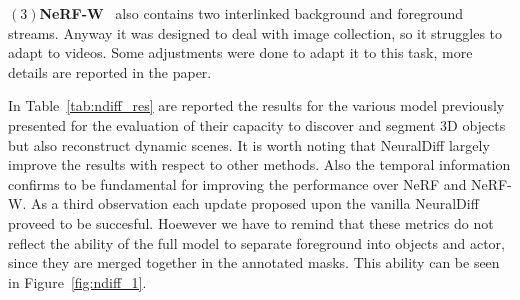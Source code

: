 $(3)$\textbf{NeRF-W}~\cite{ndiff_17} also contains two interlinked background and foreground
streams. Anyway it was designed to deal with image collection, so it struggles to 
adapt to videos. Some adjustments were done to adapt it to this task, more details
are reported in the paper.

In Table~\ref{tab:ndiff_res} are reported the results for the various model previously
presented for the evaluation of their capacity to discover and segment 3D objects
but also reconstruct dynamic scenes. It is worth noting that NeuralDiff largely improve
the results with respect to other methods. Also the temporal information confirms to 
be fundamental for improving the performance over NeRF and NeRF-W. As a third observation
each update proposed upon the vanilla NeuralDiff proveed to be succesful. Hoewever
we have to remind that these metrics do not reflect the ability of the full model to 
separate foreground into objects and actor, since they are merged together in 
the annotated masks. This ability can be seen in Figure~\ref{fig:ndiff_1}.
